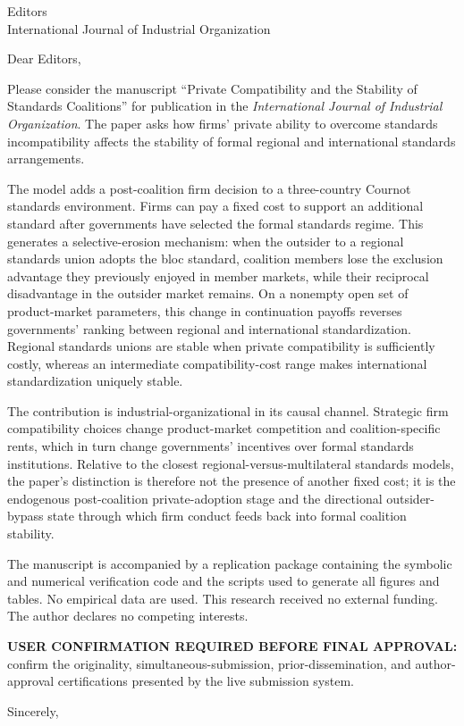 \documentclass[11pt]{letter}
\begin{document}
\begin{letter}{Editors\\International Journal of Industrial Organization}
\opening{Dear Editors,}

Please consider the manuscript ``Private Compatibility and the Stability of Standards Coalitions'' for publication in the \emph{International Journal of Industrial Organization}. The paper asks how firms' private ability to overcome standards incompatibility affects the stability of formal regional and international standards arrangements.

The model adds a post-coalition firm decision to a three-country Cournot standards environment. Firms can pay a fixed cost to support an additional standard after governments have selected the formal standards regime. This generates a selective-erosion mechanism: when the outsider to a regional standards union adopts the bloc standard, coalition members lose the exclusion advantage they previously enjoyed in member markets, while their reciprocal disadvantage in the outsider market remains. On a nonempty open set of product-market parameters, this change in continuation payoffs reverses governments' ranking between regional and international standardization. Regional standards unions are stable when private compatibility is sufficiently costly, whereas an intermediate compatibility-cost range makes international standardization uniquely stable.

The contribution is industrial-organizational in its causal channel. Strategic firm compatibility choices change product-market competition and coalition-specific rents, which in turn change governments' incentives over formal standards institutions. Relative to the closest regional-versus-multilateral standards models, the paper's distinction is therefore not the presence of another fixed cost; it is the endogenous post-coalition private-adoption stage and the directional outsider-bypass state through which firm conduct feeds back into formal coalition stability.

The manuscript is accompanied by a replication package containing the symbolic and numerical verification code and the scripts used to generate all figures and tables. No empirical data are used. This research received no external funding. The author declares no competing interests.

\textbf{USER CONFIRMATION REQUIRED BEFORE FINAL APPROVAL:} confirm the originality, simultaneous-submission, prior-dissemination, and author-approval certifications presented by the live submission system.

\closing{Sincerely,}
\end{letter}
\end{document}
